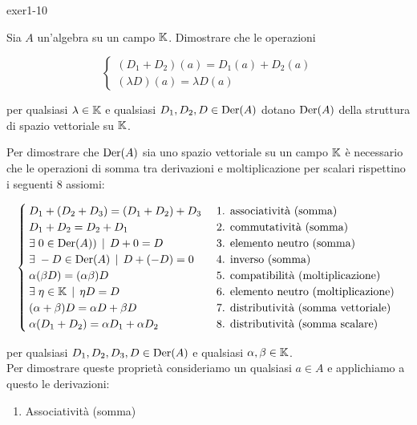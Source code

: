 {exer1-10}
{
Sia $ A $ un'algebra su un campo $ \mathbb{K} $. Dimostrare che le operazioni

\begin{equation}
	\begin{cases}
		(D_{1}+D_{2})(a) = D_{1}(a) + D_{2}(a) \\
		(\lambda D)(a) = \lambda D(a)
	\end{cases}
\end{equation}

per qualsiasi $ \lambda \in \mathbb{K} $ e qualsiasi $ D_{1},D_{2},D \in \operatorname{Der}(A) $ dotano $ \operatorname{Der}(A) $ della struttura di spazio vettoriale su $ \mathbb{K} $.
}
{
Per dimostrare che $ \operatorname{Der}(A) $ sia uno spazio vettoriale su un campo $ \mathbb{K} $ è necessario che le operazioni di somma tra derivazioni e moltiplicazione per scalari rispettino i seguenti 8 assiomi:

\begin{equation}
	\begin{cases}
		D_{1} + (D_{2} + D_{3}) = (D_{1} + D_{2}) + D_{3} & \text{ 1. associatività (somma) } \\
		D_{1} + D_{2} = D_{2} + D_{1} & \text{ 2. commutatività (somma) } \\
		\exists \; 0 \in \operatorname{Der}(A)) \, \mid \, D + 0 = D & \text{ 3. elemento neutro (somma) } \\
		\exists \; - D \in \operatorname{Der}(A) \, \mid \, D + (- D) = 0 & \text{ 4. inverso (somma) } \\
		\alpha (\beta D) = (\alpha \beta) D & \text{ 5. compatibilità (moltiplicazione) } \\
		\exists \; \eta \in \mathbb{K} \, \mid \, \eta D = D & \text{ 6. elemento neutro (moltiplicazione) } \\
		(\alpha + \beta) D = \alpha D + \beta D & \text{ 7. distributività (somma vettoriale) } \\
		\alpha (D_{1} + D_{2}) = \alpha D_{1} + \alpha D_{2} & \text{ 8. distributività (somma scalare) }
	\end{cases}
\end{equation}

per qualsiasi $ D_{1}, D_{2}, D_{3}, D \in \operatorname{Der}(A) $ e qualsiasi $ \alpha, \beta \in \mathbb{K} $. \\
Per dimostrare queste proprietà consideriamo un qualsiasi $ a \in A $ e applichiamo a questo le derivazioni:

\begin{enumerate}
	\item Associatività (somma)
	

\end{enumerate}}
